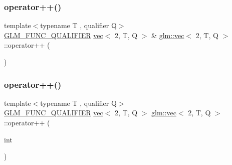 \mbox{\label{structglm_1_1vec_3_012_00_01_t_00_01_q_01_4_a3b86debb295909f1369aebf4b9a834ab}} 
\subsubsection{\texorpdfstring{operator++()}{operator++()}\hspace{0.1cm}{\footnotesize\ttfamily [1/2]}}
{\footnotesize\ttfamily template$<$typename T , qualifier Q$>$ \\
\mbox{\hyperlink{setup_8hpp_a33fdea6f91c5f834105f7415e2a64407}{G\+L\+M\+\_\+\+F\+U\+N\+C\+\_\+\+Q\+U\+A\+L\+I\+F\+I\+ER}} \mbox{\hyperlink{structglm_1_1vec}{vec}}$<$ 2, T, Q $>$ \& \mbox{\hyperlink{structglm_1_1vec}{glm\+::vec}}$<$ 2, T, Q $>$\+::operator++ (\begin{DoxyParamCaption}{ }\end{DoxyParamCaption})}

\mbox{\label{structglm_1_1vec_3_012_00_01_t_00_01_q_01_4_ab6bd7fc778f3585723da44341d9d5c37}} 
\subsubsection{\texorpdfstring{operator++()}{operator++()}\hspace{0.1cm}{\footnotesize\ttfamily [2/2]}}
{\footnotesize\ttfamily template$<$typename T , qualifier Q$>$ \\
\mbox{\hyperlink{setup_8hpp_a33fdea6f91c5f834105f7415e2a64407}{G\+L\+M\+\_\+\+F\+U\+N\+C\+\_\+\+Q\+U\+A\+L\+I\+F\+I\+ER}} \mbox{\hyperlink{structglm_1_1vec}{vec}}$<$ 2, T, Q $>$ \mbox{\hyperlink{structglm_1_1vec}{glm\+::vec}}$<$ 2, T, Q $>$\+::operator++ (\begin{DoxyParamCaption}\item[{int}]{ }\end{DoxyParamCaption})}

\mbox{\label{structglm_1_1vec_3_012_00_01_t_00_01_q_01_4_a85009f198924c17e5830290e55c04323}} 

